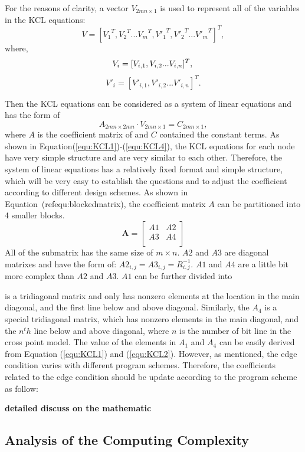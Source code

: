 For the reasons of clarity, a vector ${V}_{2mn\times 1}$ is used to represent all of the variables in the KCL equations:
\begin{equation}\label{equ:V1}
{V}=[{V_1}^T,{V_2}^T...{V_m}^T,{V'_1}^T,{V'_2}^T...{V'_m}^T]^T,
\end{equation}
where,
\begin{equation}\label{equ:V2}
{V_i} = [V_{i,1},V_{i,2}...V_{i,n}]^T,\\
\end{equation}
\begin{equation}\label{equ:V3}
{V'_i} = [V'_{i,1},V'_{i,2}...V'_{i,n}]^T.
\end{equation}

Then the KCL equations can be considered as a system of linear equations and has the form of
\begin{equation}\label{equ:matrix}
A_{2mn\times{2mn}}\cdot V_{2mn\times{1}} = C_{2mn\times{1}},
\end{equation}
where $A$ is the coefficient matrix of and $C$ contained the constant terms. As shown in Equation(\ref{equ:KCL1})-(\ref{equ:KCL4}), the KCL equations for each node have very simple structure and are very similar to each other. Therefore, the system of linear equations has a relatively fixed format and simple structure, which will be very easy to establish the questions and to adjust the coefficient according to different design schemes. As shown in Equation~(ref{equ:blockedmatrix}), the coefficient matrix $A$ can be partitioned into 4 smaller blocks.
\begin{equation}\label{equ:blockedmatrix}
    \mathbf{A} = \left[
    \begin{array}{cc}
        A1 & A2  \\
        A3 & A4  \\
    \end{array} \right]
\end{equation}
All of the submatrix has the same size of $m\times n$. $A2$ and $A3$ are diagonal matrixes and have the form of: $A2_{i,j} = A3_{i,j} = R_{i,j}^{-1}$. $A1$ and $A4$ are a little bit more complex than $A2$ and $A3$. $A1$ can be further divided into


is a tridiagonal matrix and only has nonzero elements at the location in the main diagonal, and the first line below and above diagonal. Similarly, the $A_4$ is a special tridiagonal matrix, which has nonzero elements in the main diagonal, and the $n^th$ line below and above diagonal, where $n$ is the number of bit line in the cross point model.
The value of the elements in $A_1$ and $A_4$ can be easily derived from Equation (\ref{equ:KCL1}) and (\ref{equ:KCL2}). However, as mentioned, the edge condition varies with different program schemes. Therefore, the coefficients related to the edge condition should be update according to the program scheme as follow:

\textbf{detailed discuss on the mathematic}

\subsection{Analysis of the Computing Complexity}
